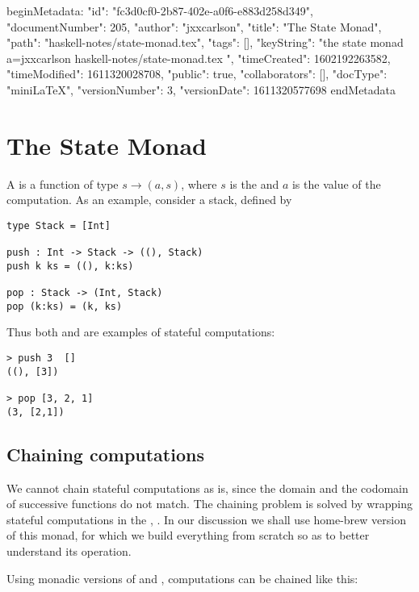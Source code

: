 beginMetadata:
{
    "id": "fc3d0cf0-2b87-402e-a0f6-e883d258d349",
    "documentNumber": 205,
    "author": "jxxcarlson",
    "title": "The State Monad",
    "path": "haskell-notes/state-monad.tex",
    "tags": [],
    "keyString": "the state monad a=jxxcarlson haskell-notes/state-monad.tex ",
    "timeCreated": 1602192263582,
    "timeModified": 1611320028708,
    "public": true,
    "collaborators": [],
    "docType": "miniLaTeX",
    "versionNumber": 3,
    "versionDate": 1611320577698
}
endMetadata
\setcounter{section}{4}

\section{The State Monad}

\innertableofcontents

A  is a function of type $s \to (a,s)$, where $s$ is the  and $a$ is the value of the computation.  As an example, consider a stack, defined by

\begin{verbatim}
type Stack = [Int]

push : Int -> Stack -> ((), Stack)
push k ks = ((), k:ks)

pop : Stack -> (Int, Stack)
pop (k:ks) = (k, ks)
\end{verbatim}

Thus both  and  are examples of stateful computations:

\begin{verbatim}
> push 3  []
((), [3])

> pop [3, 2, 1]
(3, [2,1])
\end{verbatim}


\subsection{Chaining computations}

We cannot chain stateful computations as is, since the domain and the codomain of successive functions do not match.  The chaining problem is solved by wrapping stateful computations in the , .  In our discussion we shall use home-brew version of this monad,  for which we build everything from scratch so as to better understand its operation.

Using monadic versions of  and , computations can be chained like this:


